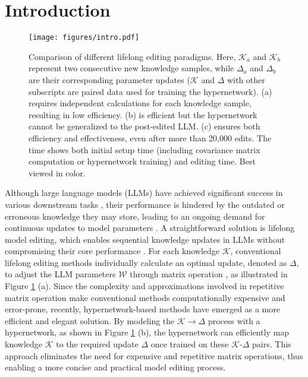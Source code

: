 \section{Introduction}
\label{sec:1}

\begin{figure}[t]
\begin{center}
\centerline{\texttt{[image: figures/intro.pdf]}}
\caption{Comparison of different lifelong editing paradigms. Here, $\mathcal{K}_a$ and $\mathcal{K}_b$ represent two consecutive new knowledge samples, while $\Delta_a$ and $\Delta_b$ are their corresponding parameter updates ($\mathcal{K}$ and $\Delta$ with other subscripts are paired data used for training the hypernetwork). (a) requires independent calculations for each knowledge sample, resulting in low efficiency. (b) is efficient but the hypernetwork cannot be generalized to the post-edited LLM. (c) ensures both efficiency and effectiveness, even after more than 20,000 edits. The time shows both initial setup time (including covariance matrix computation or hypernetwork training) and editing time. Best viewed in color.}
\label{fig:intro}
\end{center}
\vskip -0.25in
\end{figure}

Although large language models (LLMs) have achieved significant success in various downstream tasks \cite{gpt3, survey-llm},  their performance is hindered by the outdated or erroneous knowledge they may store, leading to an ongoing demand for continuous updates to model parameters \cite{mind-the-gap, editing-factual-knowledge}. A straightforward solution is lifelong model editing, which enables sequential knowledge updates in LLMs without compromising their core performance \cite{grace, wise, alphaedit}.  For each knowledge $\mathcal{K}$, conventional lifelong editing methods individually calculate an optimal update, denoted as $\Delta$, to adjust the LLM parameters $\mathcal{W}$ through matrix operation \cite{rome, memit}, as illustrated in Figure \ref{fig:intro} (a). Since the complexity and approximations involved in repetitive matrix operation make conventional methods computationally expensive and error-prone,  recently, hypernetwork-based methods \cite{mend, malmen} have emerged as a more efficient and elegant solution. 
By modeling the $\mathcal{K} \rightarrow \Delta$ process with a hypernetwork, as shown in Figure \ref{fig:intro} (b), the hypernetwork can efficiently map knowledge $\mathcal{K}$ to the required update $\Delta$ once trained on these $\mathcal{K}\mbox{-}\Delta$ pairs. This approach eliminates the need for expensive and repetitive matrix operations, thus enabling a more concise and practical model editing process.

